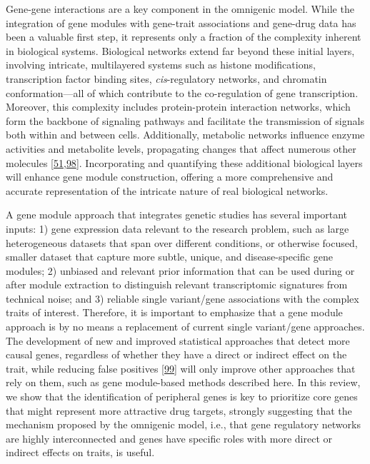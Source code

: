 Gene-gene interactions are a key component in the omnigenic model.
While the integration of gene modules with gene-trait associations and gene-drug data has been a valuable first step, it represents only a fraction of the complexity inherent in biological systems.
Biological networks extend far beyond these initial layers, involving intricate, multilayered systems such as histone modifications, transcription factor binding sites, \emph{cis}-regulatory networks, and chromatin conformation---all of which contribute to the co-regulation of gene transcription.
Moreover, this complexity includes protein-protein interaction networks, which form the backbone of signaling pathways and facilitate the transmission of signals both within and between cells.
Additionally, metabolic networks influence enzyme activities and metabolite levels, propagating changes that affect numerous other molecules {[}\protect\hyperlink{ref-dg9nKuy0}{51},\protect\hyperlink{ref-KNAOTAKP}{98}{]}.
Incorporating and quantifying these additional biological layers will enhance gene module construction, offering a more comprehensive and accurate representation of the intricate nature of real biological networks.

A gene module approach that integrates genetic studies has several important inputs: 1) gene expression data relevant to the research problem, such as large heterogeneous datasets that span over different conditions, or otherwise focused, smaller dataset that capture more subtle, unique, and disease-specific gene modules; 2) unbiased and relevant prior information that can be used during or after module extraction to distinguish relevant transcriptomic signatures from technical noise; and 3) reliable single variant/gene associations with the complex traits of interest.
Therefore, it is important to emphasize that a gene module approach is by no means a replacement of current single variant/gene approaches.
The development of new and improved statistical approaches that detect more causal genes, regardless of whether they have a direct or indirect effect on the trait, while reducing false positives {[}\protect\hyperlink{ref-i8Qjy4pw}{99}{]} will only improve other approaches that rely on them, such as gene module-based methods described here.
In this review, we show that the identification of peripheral genes is key to prioritize core genes that might represent more attractive drug targets, strongly suggesting that the mechanism proposed by the omnigenic model, i.e., that gene regulatory networks are highly interconnected and genes have specific roles with more direct or indirect effects on traits, is useful.


